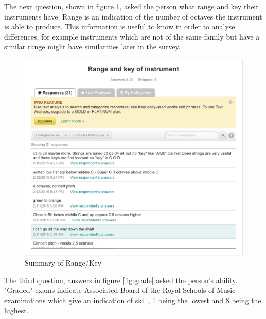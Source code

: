\begin{appendices}
The next question, shown in figure \ref{fig:range}, asked the person what range and key their instruments have. Range is an indication of the number of octaves the instrument is able to produce. This information is useful to know in order to analyse differences, for example instruments which are not of the same family but have a similar range might have similarities later in the survey.
\begin{figure}[H]
\centering
\includegraphics[width=\textwidth]{survey_results/range_key}
\caption{Summary of Range/Key}	
\label{fig:range}
\end{figure}

The third question, answers in figure \ref{fig:grade} asked the person's ability. "Graded" exams indicate Associated Board of the Royal Schools of Music examinations which give an indication of skill, 1 being the lowest and 8 being the highest.


\end{appendices}
